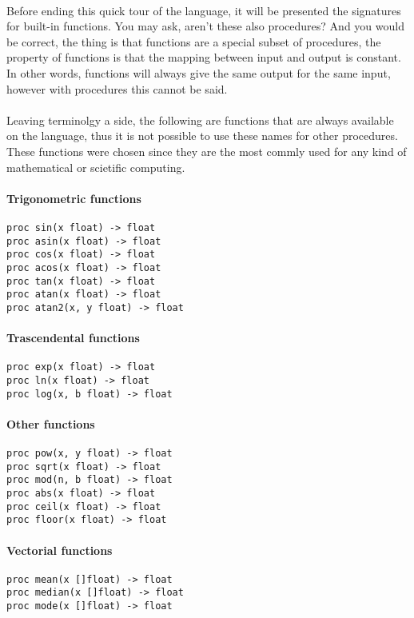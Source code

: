 \paragraph{} Before ending this quick tour of the language, it will be
presented the signatures for built-in functions. You may ask, aren't these also
procedures? And you would be correct, the thing is that functions are a
special subset of procedures, the property of functions is that the mapping
between input and output is constant. In other words, functions will always
give the same output for the same input, however with procedures this cannot
be said.

\paragraph{} Leaving terminolgy a side, the following are functions that are
always available on the language, thus it is not possible to use these names
for other procedures. These functions were chosen since they are the most
commly used for any kind of mathematical or scietific computing.

\paragraph{Trigonometric functions}

\begin{verbatim}
proc sin(x float) -> float
proc asin(x float) -> float
proc cos(x float) -> float
proc acos(x float) -> float
proc tan(x float) -> float
proc atan(x float) -> float
proc atan2(x, y float) -> float
\end{verbatim}

\paragraph{Trascendental functions}

\begin{verbatim}
proc exp(x float) -> float
proc ln(x float) -> float
proc log(x, b float) -> float
\end{verbatim}

\paragraph{Other functions}

\begin{verbatim}
proc pow(x, y float) -> float
proc sqrt(x float) -> float
proc mod(n, b float) -> float
proc abs(x float) -> float
proc ceil(x float) -> float
proc floor(x float) -> float
\end{verbatim}

\paragraph{Vectorial functions}

\begin{verbatim}
proc mean(x []float) -> float
proc median(x []float) -> float
proc mode(x []float) -> float
\end{verbatim}
